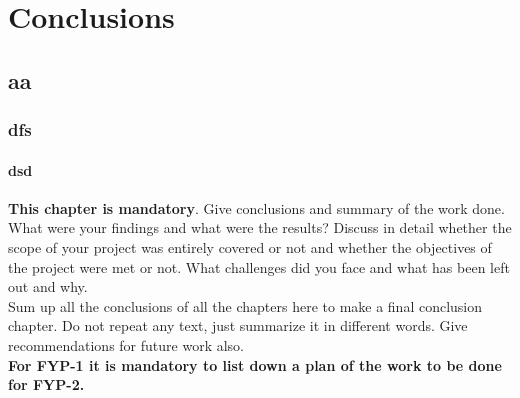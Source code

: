 \chapter{Conclusions}
\section{aa}
\subsection{dfs}
\subsubsection{dsd}
{\bf This chapter is mandatory}.  
Give conclusions and summary of the work done.  What were your findings and what were the results?  Discuss in detail whether the scope of your project was entirely covered or not and whether the objectives of the project were met or not.  What challenges did you face and what has been left out and why.\\
Sum up all the conclusions of all the chapters here to make a final conclusion chapter.  Do not repeat any text, just summarize it in different words. Give recommendations for future work also.\\
\textbf{For FYP-1 it is mandatory to list down a plan of the work to be done for FYP-2.}

